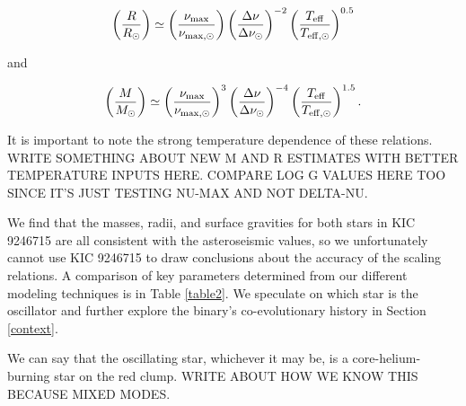 \begin{equation} %
\left( \frac{R}{R_\odot} \right) \simeq \left( \frac{\nu_{\rm{max}}}{\nu_{\rm{max,\odot}}} \right) \left( \frac{\Delta \nu}{\Delta \nu_\odot} \right)^{-2} \left( \frac{T_{\rm{eff}}}{T_{\rm{eff,\odot}}} \right)^{0.5}
\end{equation}

and

\begin{equation} %
\left( \frac{M}{M_\odot} \right) \simeq {\left( \frac{\nu_{\rm{max}}}{\nu_{\rm{max,\odot}}} \right)}^{3} \left( \frac{\Delta \nu}{\Delta \nu_\odot} \right)^{-4} \left( \frac {T_{\rm{eff}}} {T_{\rm{eff,\odot}}} \right)^{1.5}.
\end{equation}

It is important to note the strong temperature dependence of these relations. WRITE SOMETHING ABOUT NEW M AND R ESTIMATES WITH BETTER TEMPERATURE INPUTS HERE. COMPARE LOG G VALUES HERE TOO SINCE IT'S JUST TESTING NU-MAX AND NOT DELTA-NU.

We find that the masses, radii, and surface gravities for both stars in KIC 9246715 are all consistent with the asteroseismic values, so we unfortunately cannot use KIC 9246715 to draw conclusions about the accuracy of the scaling relations. A comparison of key parameters determined from our different modeling techniques is in Table \ref{table2}. We speculate on which star is the oscillator and further explore the binary's co-evolutionary history in Section \ref{context}.

We can say that the oscillating star, whichever it may be, is a core-helium-burning star on the red clump. WRITE ABOUT HOW WE KNOW THIS BECAUSE MIXED MODES.

    